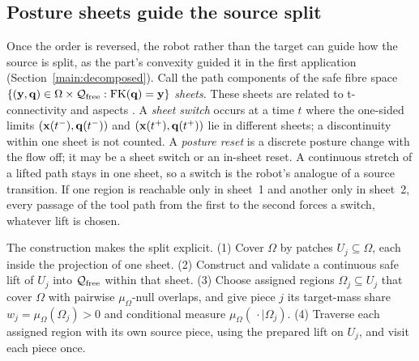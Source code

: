 \subsection{Posture sheets guide the source split}
\label{sec:kin-sheets}
Once the order is reversed, the robot rather than the target can guide how the source is split, as the part's convexity guided it in the first application (Section~\ref{main:decomposed}). Call the path components of the safe fibre space $\{({\bm{\mathrm{y}}},{\bm{\mathrm{q}}})\in\Omega\times\mathcal{Q}_{\mathrm{free}}:\operatorname{FK}({\bm{\mathrm{q}}})={\bm{\mathrm{y}}}\}$ \emph{sheets}. These sheets are related to t-connectivity \cite{wenger1991freeworkspace} and aspects \cite{borrel1986aspects}. A \emph{sheet switch} occurs at a time $t$ where the one-sided limits $({\bm{\mathrm{x}}}(t^-),{\bm{\mathrm{q}}}(t^-))$ and $({\bm{\mathrm{x}}}(t^+),{\bm{\mathrm{q}}}(t^+))$ lie in different sheets; a discontinuity within one sheet is not counted. A \emph{posture reset} is a discrete posture change with the flow off; it may be a sheet switch or an in-sheet reset. A continuous stretch of a lifted path stays in one sheet, so a switch is the robot's analogue of a source transition. If one region is reachable only in sheet~1 and another only in sheet~2, every passage of the tool path from the first to the second forces a switch, whatever lift is chosen.

The construction makes the split explicit. (1) Cover $\Omega$ by patches $U_j\subseteq\Omega$, each inside the projection of one sheet. (2) Construct and validate a continuous safe lift of $U_j$ into $\mathcal{Q}_{\mathrm{free}}$ within that sheet. (3) Choose assigned regions $\Omega_j\subseteq U_j$ that cover $\Omega$ with pairwise $\mu_\Omega$-null overlaps, and give piece $j$ its target-mass share $w_j=\mu_\Omega(\Omega_j)>0$ and conditional measure $\mu_\Omega(\,\cdot\mid\Omega_j)$. (4) Traverse each assigned region with its own source piece, using the prepared lift on $U_j$, and visit each piece once.

